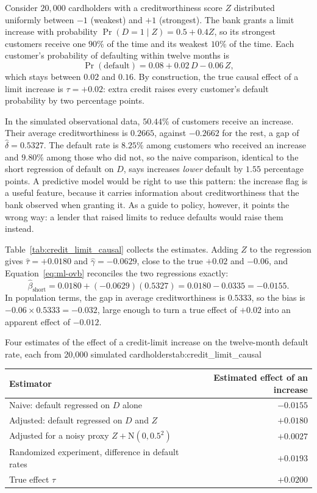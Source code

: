 \documentclass[../ai_in_finance]{subfiles}
\begin{document}
Consider $20{,}000$ cardholders with a creditworthiness score $Z$ distributed uniformly between $-1$ (weakest) and $+1$ (strongest). The bank grants a limit increase with probability $\Pr(D=1 \mid Z) = 0.5 + 0.4Z$, so its strongest customers receive one $90\%$ of the time and its weakest $10\%$ of the time. Each customer's probability of defaulting within twelve months is
\begin{equation*}
\Pr(\text{default}) = 0.08 + 0.02\,D - 0.06\,Z,
\end{equation*}
which stays between $0.02$ and $0.16$. By construction, the true causal effect of a limit increase is $\tau = +0.02$: extra credit raises every customer's default probability by two percentage points.

In the simulated observational data, $50.44\%$ of customers receive an increase. Their average creditworthiness is $0.2665$, against $-0.2662$ for the rest, a gap of $\hat\delta = 0.5327$. The default rate is $8.25\%$ among customers who received an increase and $9.80\%$ among those who did not, so the naive comparison, identical to the short regression of default on $D$, says increases \emph{lower} default by $1.55$ percentage points. A predictive model would be right to use this pattern: the increase flag is a useful feature, because it carries information about creditworthiness that the bank observed when granting it. As a guide to policy, however, it points the wrong way: a lender that raised limits to reduce defaults would raise them instead.

Table~\ref{tab:credit_limit_causal} collects the estimates. Adding $Z$ to the regression gives $\hat\tau = +0.0180$ and $\hat\gamma = -0.0629$, close to the true $+0.02$ and $-0.06$, and Equation~\eqref{eq:ml-ovb} reconciles the two regressions exactly:
\begin{equation*}
\hat\beta_{\text{short}} = 0.0180 + (-0.0629)(0.5327) = 0.0180 - 0.0335 = -0.0155.
\end{equation*}
In population terms, the gap in average creditworthiness is $0.5333$, so the bias is $-0.06 \times 0.5333 = -0.032$, large enough to turn a true effect of $+0.02$ into an apparent effect of $-0.012$.

\begin{booktable}[htbp]{Four estimates of the effect of a credit-limit increase on the twelve-month default rate, each from 20{,}000 simulated cardholders}{tab:credit_limit_causal}
\begin{tabular}{lr}
\toprule
Estimator & Estimated effect of an increase \\
\midrule
Naive: default regressed on $D$ alone & $-0.0155$ \\
Adjusted: default regressed on $D$ and $Z$ & $+0.0180$ \\
Adjusted for a noisy proxy $Z + \text{N}(0, 0.5^2)$ & $+0.0027$ \\
Randomized experiment, difference in default rates & $+0.0193$ \\
\midrule
True effect $\tau$ & $+0.0200$ \\
\bottomrule
\end{tabular}
\end{booktable}
\end{document}
